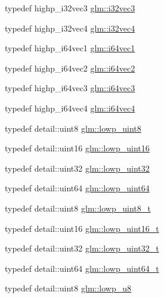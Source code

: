 \begin{DoxyCompactItemize}
\item 
typedef highp\-\_\-i32vec3 \hyperlink{group__gtc__type__precision_gab67e08f6a4b1bce82a9a34ecb2bfba64}{glm\-::i32vec3}
\item 
typedef highp\-\_\-i32vec4 \hyperlink{group__gtc__type__precision_ga3ada3676600db65a425058c0a150d83e}{glm\-::i32vec4}
\item 
typedef highp\-\_\-i64vec1 \hyperlink{group__gtc__type__precision_ga7ee2c91a98ebd719ae26e15ad89106de}{glm\-::i64vec1}
\item 
typedef highp\-\_\-i64vec2 \hyperlink{group__gtc__type__precision_ga5a03cb457be28a9a8b9e61163fe648a1}{glm\-::i64vec2}
\item 
typedef highp\-\_\-i64vec3 \hyperlink{group__gtc__type__precision_ga189eb8d6a197bc491cabb6e1f120ecf4}{glm\-::i64vec3}
\item 
typedef highp\-\_\-i64vec4 \hyperlink{group__gtc__type__precision_gade5e969a6155752095d2cd603bda9408}{glm\-::i64vec4}
\item 
typedef detail\-::uint8 \hyperlink{group__gtc__type__precision_ga4d9dc08b7b248a386dfe9afd00fc6b1e}{glm\-::lowp\-\_\-uint8}
\item 
typedef detail\-::uint16 \hyperlink{group__gtc__type__precision_ga9b8409887319f62f06e664f6ca121b9d}{glm\-::lowp\-\_\-uint16}
\item 
typedef detail\-::uint32 \hyperlink{group__gtc__type__precision_gaf11e85af414720b4cd12bd57b3a81e68}{glm\-::lowp\-\_\-uint32}
\item 
typedef detail\-::uint64 \hyperlink{group__gtc__type__precision_gacf666a9d9b309c4615c7a4f2ab0be289}{glm\-::lowp\-\_\-uint64}
\item 
typedef detail\-::uint8 \hyperlink{group__gtc__type__precision_ga0910ef24195d1b8b26e34d73148c0c45}{glm\-::lowp\-\_\-uint8\-\_\-t}
\item 
typedef detail\-::uint16 \hyperlink{group__gtc__type__precision_ga9a71176a4e5bc61951f9e9197d9c80e1}{glm\-::lowp\-\_\-uint16\-\_\-t}
\item 
typedef detail\-::uint32 \hyperlink{group__gtc__type__precision_ga9f8cb602a358e1f48bda2682cf051f0c}{glm\-::lowp\-\_\-uint32\-\_\-t}
\item 
typedef detail\-::uint64 \hyperlink{group__gtc__type__precision_gabf3069d4f188557a87b1d7f35eb0a270}{glm\-::lowp\-\_\-uint64\-\_\-t}
\item 
typedef detail\-::uint8 \hyperlink{group__gtc__type__precision_gae63f942c49a30dbf266b2f13f3efe257}{glm\-::lowp\-\_\-u8}
\item 

\end{DoxyCompactItemize}

